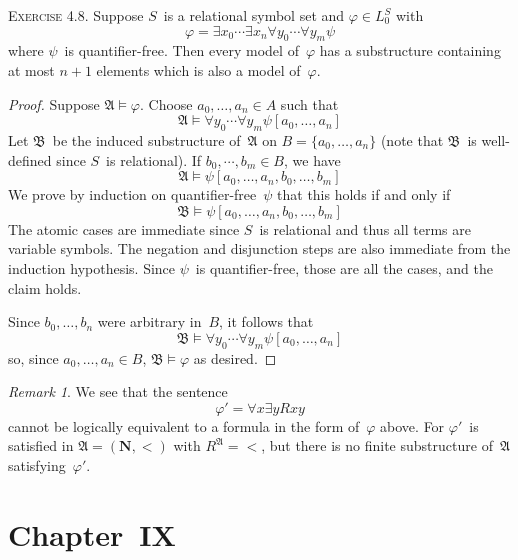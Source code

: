 \documentclass[letterpaper]{article}
\newcommand{\N}{\mathbf{N}}
\newcommand{\A}{\mathfrak{A}}
\newcommand{\B}{\mathfrak{B}}
\theoremstyle{remark}
\newtheorem*{rmk}{Remark}
\begin{document}
\noindent\textsc{Exercise 4.8.}
Suppose $S$~is a relational symbol set and $\varphi\in L_0^S$ with
$$\varphi=\exists x_0\cdots\exists x_n\forall y_0\cdots\forall y_m\psi$$
where $\psi$~is quantifier-free. Then every model of~$\varphi$ has a substructure containing at most $n+1$ elements which is also a model of~$\varphi$.
\begin{proof}
Suppose $\A\models\varphi$. Choose $a_0,\ldots,a_n\in A$ such that
$$\A\models\forall y_0\cdots\forall y_m\psi[a_0,\ldots,a_n]$$
Let $\B$~be the induced substructure of~$\A$ on $B=\{a_0,\ldots,a_n\}$ (note that $\B$~is well-defined since $S$~is relational). If $b_0,\cdots,b_m\in B$, we have
$$\A\models\psi[a_0,\ldots,a_n,b_0,\ldots,b_m]$$
We prove by induction on quantifier-free~$\psi$ that this holds if and only if
$$\B\models\psi[a_0,\ldots,a_n,b_0,\ldots,b_m]$$
The atomic cases are immediate since $S$~is relational and thus all terms are variable symbols. The negation and disjunction steps are also immediate from the induction hypothesis. Since $\psi$~is quantifier-free, those are all the cases, and the claim holds.

Since $b_0,\ldots,b_n$ were arbitrary in~$B$, it follows that
$$\B\models\forall y_0\cdots\forall y_m\psi[a_0,\ldots,a_n]$$
so, since $a_0,\ldots,a_n\in B$, $\B\models\varphi$ as desired.
\end{proof}
\begin{rmk}
We see that the sentence
$$\varphi'=\forall x\exists y Rxy$$
cannot be logically equivalent to a formula in the form of~$\varphi$ above. For $\varphi'$~is satisfied in $\A=(\N,<)$ with $R^{\A}={<}$, but there is no finite substructure of~$\A$ satisfying~$\varphi'$.
\end{rmk}

\section*{Chapter~IX}
\end{document}
